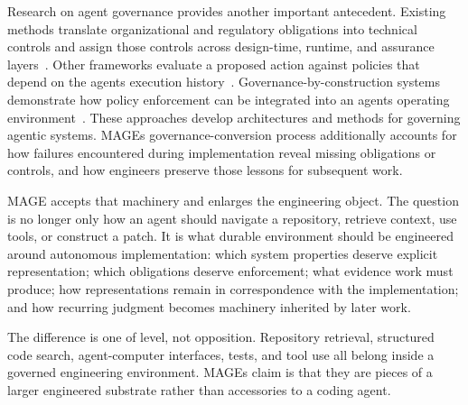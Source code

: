
Research on agent governance provides another important antecedent. Existing methods translate organizational and regulatory obligations into technical controls and assign those controls across design-time, runtime, and assurance layers~\citep{koch2026governance}. Other frameworks evaluate a proposed action against policies that depend on the agent\textquotesingle s execution history~\citep{kaptein2026runtime}. Governance-by-construction systems demonstrate how policy enforcement can be integrated into an agent\textquotesingle s operating environment~\citep{shlomov2026construction}. These approaches develop architectures and methods for governing agentic systems. MAGE\textquotesingle s governance-conversion process additionally accounts for how failures encountered during implementation reveal missing obligations or controls, and how engineers preserve those lessons for subsequent work.


MAGE accepts that machinery and enlarges the engineering object. The question is no longer only how an agent should navigate a repository, retrieve context, use tools, or construct a patch. It is what durable environment should be engineered around autonomous implementation: which system properties deserve explicit representation; which obligations deserve enforcement; what evidence work must produce; how representations remain in correspondence with the implementation; and how recurring judgment becomes machinery inherited by later work.


The difference is one of level, not opposition. Repository retrieval, structured code search, agent-computer interfaces, tests, and tool use all belong inside a governed engineering environment. MAGE\textquotesingle s claim is that they are pieces of a larger engineered substrate rather than accessories to a coding agent.

